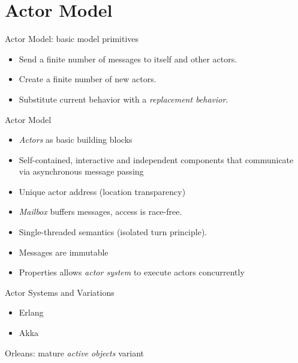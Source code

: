 \documentclass{beamer}
\begin{document}

\section{Actor Model}


\begin{frame}{Actor Model: basic model primitives}

\begin{itemize}
  \item Send a finite number of messages to itself and other actors.
  \item Create a finite number of new actors.
  \item Substitute current behavior with a \textit{replacement behavior}.
\end{itemize}

\end{frame}


\begin{frame}{Actor Model}

\begin{itemize}
  \item \textit{Actors} as basic building blocks
  \item Self-contained, interactive and independent components that communicate via asynchronous message passing
  \item Unique actor address (location transparency)
  \item \textit{Mailbox} buffers messages, access is race-free.
  \item Single-threaded semantics (isolated turn principle).
  \item Messages are immutable
  \item Properties allows \textit{actor system} to execute actors concurrently
\end{itemize}

\end{frame}


\begin{frame}{Actor Systems and Variations}

\begin{itemize}
  \item Erlang
  \item Akka
\end{itemize}
  \item Orleans: mature \textit{active objects} variant

\end{frame}
\end{document}
